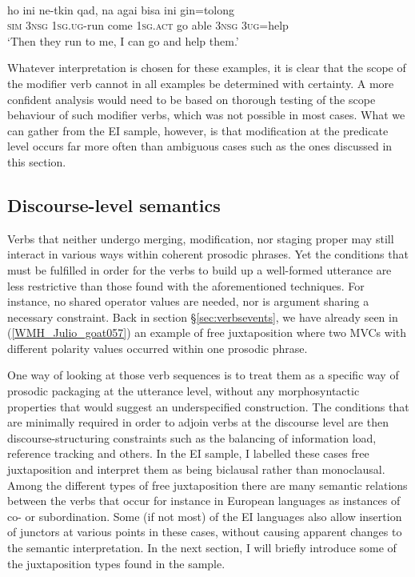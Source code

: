 \ea \label{Klon_61} 
\\
\gll ho ini ne-tkin qad, na agai bisa ini gin=tolong \\
\textsc{sim} 3\textsc{nsg} 1\textsc{sg}.\textsc{ug}-run come 1\textsc{sg}.\textsc{act} go able 3\textsc{nsg} 3\textsc{ug}=help \\
\glft `Then they run to me, I can go and help them.' \\ 
\z

Whatever interpretation is chosen for these examples, it is clear that the scope of the modifier verb cannot in all examples be determined with certainty. A more confident analysis would need to be based on thorough testing of the scope behaviour of such modifier verbs, which was not possible in most cases. What we can gather from the EI sample, however, is that modification at the predicate level occurs far more often than ambiguous cases such as the ones discussed in this section.

\subsection{Discourse-level semantics} \label{sec:discourse-level}

Verbs that neither undergo merging, modification, nor staging proper may still interact in various ways within coherent prosodic phrases. Yet the conditions that must be fulfilled in order for the verbs to build up a well-formed utterance are less restrictive than those found with the aforementioned techniques. For instance, no shared operator values are needed, nor is argument sharing a necessary constraint. Back in section §\ref{sec:verbsevents}, we have already seen in (\ref{WMH_Julio_goat057}) an example of free juxtaposition where two MVCs with different polarity values occurred within one prosodic phrase. 

One way of looking at those verb sequences is to treat them as a specific way of prosodic packaging at the utterance level, without any morphosyntactic properties that would suggest an underspecified construction. The conditions that are minimally required in order to adjoin verbs at the discourse level are then discourse-structuring constraints such as the balancing of information load, reference tracking and others. In the EI sample, I labelled these cases free juxtaposition and interpret them as being biclausal rather than monoclausal. Among the different types of free juxtaposition there are many semantic relations between the verbs that occur for instance in European languages as instances of co- or subordination. Some (if not most) of the EI languages also allow insertion of junctors at various points in these cases, without causing apparent changes to the semantic interpretation. In the next section, I will briefly introduce some of the juxtaposition types found in the sample.

